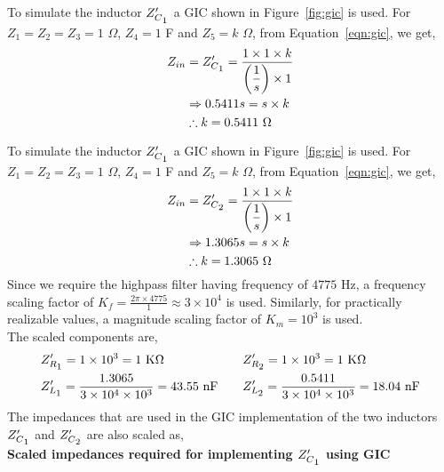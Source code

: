 \documentclass{lab_sheet}
\newcommand\ddfrac[2]{\frac{\displaystyle #1}{\displaystyle #2}}
\begin{document}
To simulate the inductor $Z'_{C\textsubscript{$1$}}$ a GIC shown in Figure~\ref{fig:gic} is used. For $Z_1=Z_2=Z_3=1$ $\Omega$, $Z_4=1$ F and $Z_5=k$ $\Omega$, from Equation~\ref{eqn:gic}, we get,
    \begin{equation*}
        \begin{aligned}
            Z_{in}&=Z'_{C\textsubscript{$1$}}=\ddfrac{1\times1\times k}{\left(\frac{1}{s}\right)\times 1}\\
            &\Rightarrow 0.5411s=s\times k\\
            &\therefore k=0.5411 \text{ }\Omega
        \end{aligned}
    \end{equation*}

    
To simulate the inductor $Z'_{C\textsubscript{$1$}}$ a GIC shown in Figure~\ref{fig:gic} is used. For $Z_1=Z_2=Z_3=1$ $\Omega$, $Z_4=1$ F and $Z_5=k$ $\Omega$, from Equation~\ref{eqn:gic}, we get,
\begin{equation*}
    \begin{aligned}
        Z_{in}&=Z'_{C\textsubscript{$2$}}=\ddfrac{1\times1\times k}{\left(\frac{1}{s}\right)\times 1}\\
        &\Rightarrow 1.3065s=s\times k\\
        &\therefore k=1.3065 \text{ }\Omega
    \end{aligned}
\end{equation*}
Since we require the highpass filter having frequency of $4775$ Hz, a frequency scaling factor of $K_f=\ddfrac{2\pi\times4775}{1}\approx 3\times 10^4$ is used. Similarly, for practically realizable values, a magnitude scaling factor of $K_m=10^3$ is used.\\ The scaled components are,
\begin{equation*}
    \begin{aligned}
       & Z'_{R\textsubscript{$1$}}=1\times10^3=1\text{ K}\Omega\quad && Z'_{R\textsubscript{$2$}}=1\times10^3=1\text{ K}\Omega\\
       & Z'_{L\textsubscript{$1$}}=\frac{1.3065}{3\times10^4\times10^3}=43.55\text{ nF} \quad && Z'_{L\textsubscript{$2$}}=\frac{0.5411}{3\times10^4\times10^3}=18.04\text{ nF} 
    \end{aligned}
\end{equation*}
The impedances that are used in the GIC implementation of the two inductors $Z'_{C\textsubscript{$1$}}$ and $Z'_{C\textsubscript{$2$}}$ are also scaled as,\\
\textbf{Scaled impedances required for implementing $Z'_{C\textsubscript{$1$}}$ using GIC}
\end{document}
